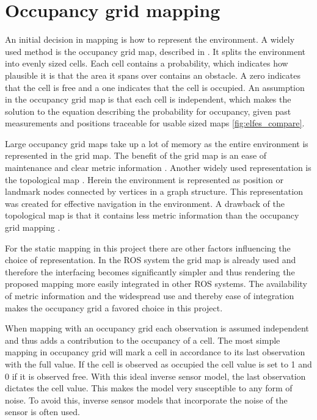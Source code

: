 \section{Occupancy grid mapping}
\label{sec:occupancy_grid_mapping}
An initial decision in mapping is how to represent the environment. A widely used method is the occupancy grid map, described in \cite{elfesMoravecOccGrid}. It splits the environment into evenly sized cells. 
Each cell contains a probability, which indicates how plausible it is that the area it spans over contains an obstacle.
A zero indicates that the cell is free and a one indicates that the cell is occupied.
An assumption in the occupancy grid map is that each cell is independent, which makes the solution to the equation describing the probability for occupancy, given past measurements and positions traceable for usable sized maps \ref{fig:elfes_compare}. 

Large occupancy grid maps take up a lot of memory as the entire environment is represented in the grid map. 
The benefit of the grid map is an ease of maintenance and clear metric information \cite{mapbuildingSummary}. 
Another widely used representation is the topological map \cite{topologyOrig}. 
Herein the environment is represented as position or landmark nodes connected by vertices in a graph structure. 
This representation was created for effective navigation in the environment. 
A drawback of the topological map is that it contains less metric information than the occupancy grid mapping \cite{mapbuildingSummary}.

For the static mapping in this project there are other factors influencing the choice of representation. In the ROS system the grid map is already used and therefore the interfacing becomes significantly simpler and thus rendering the proposed mapping more easily integrated in other ROS systems. The availability of metric information and the widespread use and thereby ease of integration makes the occupancy grid a favored choice in this project. 

When mapping with an occupancy grid each observation is assumed independent and thus adds a contribution to the occupancy of a cell. The most simple mapping in occupancy grid will mark a cell in accordance to its last observation with the full value. If the cell is observed as occupied the cell value is set to 1 and 0 if it is observed free. 
With this ideal inverse sensor model, the last observation dictates the cell value. 
This makes the model very susceptible to any form of noise. 
To avoid this, inverse sensor models that incorporate the noise of the sensor is often used.

